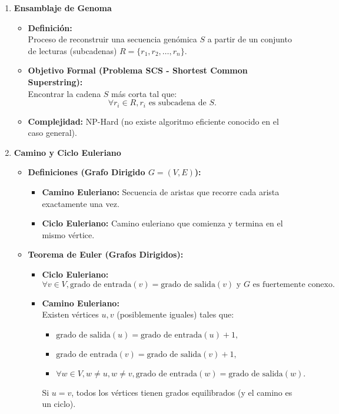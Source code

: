 \documentclass[fleqn,10pt]{article}
\begin{document}
\begin{enumerate}
    \item \textbf{Ensamblaje de Genoma}
    \begin{itemize}
        \item \textbf{Definición:} \\
        Proceso de reconstruir una secuencia genómica $S$ a partir de un conjunto de lecturas (subcadenas) $R = \{r_1, r_2, \dots, r_n\}$.
        \item \textbf{Objetivo Formal (Problema SCS - Shortest Common Superstring):} \\
        Encontrar la cadena $S$ más corta tal que:
        \[ \forall r_i \in R, r_i \text{ es subcadena de } S. \]
        \item \textbf{Complejidad:} NP-Hard (no existe algoritmo eficiente conocido en el caso general).
    \end{itemize}

    \item \textbf{Camino y Ciclo Euleriano}
    \begin{itemize}
        \item \textbf{Definiciones (Grafo Dirigido $G=(V,E)$):}
        \begin{itemize}
            \item \textbf{Camino Euleriano:} Secuencia de aristas que recorre cada arista exactamente una vez.
            \item \textbf{Ciclo Euleriano:} Camino euleriano que comienza y termina en el mismo vértice.
        \end{itemize}
        \item \textbf{Teorema de Euler (Grafos Dirigidos):}
        \begin{itemize}
            \item \textbf{Ciclo Euleriano:}
            \[ \forall v \in V, \text{grado de entrada}(v) = \text{grado de salida}(v) \text{ y } G \text{ es fuertemente conexo.} \]
            \item \textbf{Camino Euleriano:} \\
            Existen vértices $u,v$ (posiblemente iguales) tales que:
            \begin{itemize}
                \item $\text{grado de salida}(u) = \text{grado de entrada}(u) + 1,$
                \item $\text{grado de entrada}(v) = \text{grado de salida}(v) + 1,$
                \item $\forall w \in V, w \neq u, w \neq v, \text{grado de entrada}(w) = \text{grado de salida}(w).$
            \end{itemize}
            Si $u=v$, todos los vértices tienen grados equilibrados (y el camino es un ciclo).
        \end{itemize}
    \end{itemize}


\end{enumerate}
\end{document}

